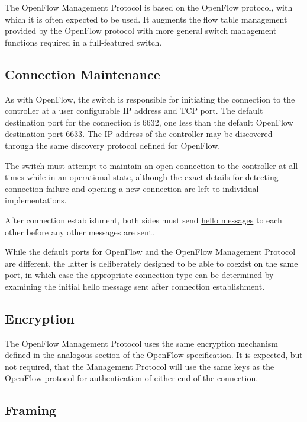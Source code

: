 \documentclass[11pt,a4paper]{article}
\begin{document}
  The OpenFlow Management Protocol is based on the OpenFlow
  protocol, with which it is often expected to be used.  It augments
  the flow table management provided by the OpenFlow protocol with
  more general switch management functions required in a full-featured
  switch.

\subsection{Connection Maintenance}
\label{sec-2.1}


   As with OpenFlow, the switch is responsible for initiating the
   connection to the controller at a user configurable IP address and
   TCP port.  The default destination port for the connection is 6632,
   one less than the default OpenFlow destination port 6633.  The IP
   address of the controller may be discovered through the same
   discovery protocol defined for OpenFlow.

   The switch must attempt to maintain an open connection to the
   controller at all times while in an operational state, although the
   exact details for detecting connection failure and opening a new
   connection are left to individual implementations.

   After connection establishment, both sides must send \hyperref[sec-2.6.1]{hello messages}
   to each other before any other messages are sent.

   While the default ports for OpenFlow and the OpenFlow Management
   Protocol are different, the latter is deliberately designed to be
   able to coexist on the same port, in which case the appropriate
   connection type can be determined by examining the initial hello
   message sent after connection establishment.

\subsection{Encryption}
\label{sec-2.2}


   The OpenFlow Management Protocol uses the same encryption
   mechanism defined in the analogous section of the OpenFlow
   specification.  It is expected, but not required, that the 
   Management Protocol will use the same keys as the OpenFlow
   protocol for authentication of either end of the connection.

\subsection{Framing}
\label{sec-2.3}
\end{document}
